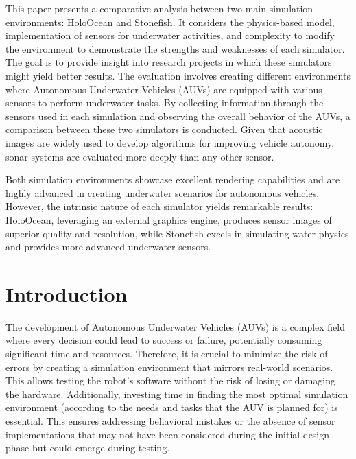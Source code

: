 \documentclass[]{article}
\begin{document}
	
	
	This paper presents a comparative analysis between two main simulation environments: HoloOcean and Stonefish. It considers the physics-based model, implementation of sensors for underwater activities, and complexity to modify the environment to demonstrate the strengths and weaknesses of each simulator. The goal is to provide insight into research projects in which these simulators might yield better results. The evaluation involves creating different environments where Autonomous Underwater Vehicles (AUVs) are equipped with various sensors to perform underwater tasks. By collecting information through the sensors used in each simulation and observing the overall behavior of the AUVs, a comparison between these two simulators is conducted. Given that acoustic images are widely used to develop algorithms for improving vehicle autonomy, sonar systems are evaluated more deeply than any other sensor.
	
	Both simulation environments showcase excellent rendering capabilities and are highly advanced in creating underwater scenarios for autonomous vehicles. However, the intrinsic nature of each simulator yields remarkable results: HoloOcean, leveraging an external graphics engine, produces sensor images of superior quality and resolution, while Stonefish excels in simulating water physics and provides more advanced underwater sensors.
	
	\newpage
	\tableofcontents
	
	\clearpage
	
	\section{Introduction}
	
	
	The development of Autonomous Underwater Vehicles (AUVs) is a complex field where every decision could lead to success or failure, potentially consuming significant time and resources. Therefore, it is crucial to minimize the risk of errors by creating a simulation environment that mirrors real-world scenarios. This allows testing the robot's software without the risk of losing or damaging the hardware. Additionally, investing time in finding the most optimal simulation environment (according to the needs and tasks that the AUV is planned for) is essential. This ensures addressing behavioral mistakes or the absence of sensor implementations that may not have been considered during the initial design phase but could emerge during testing.
	
\end{document}
